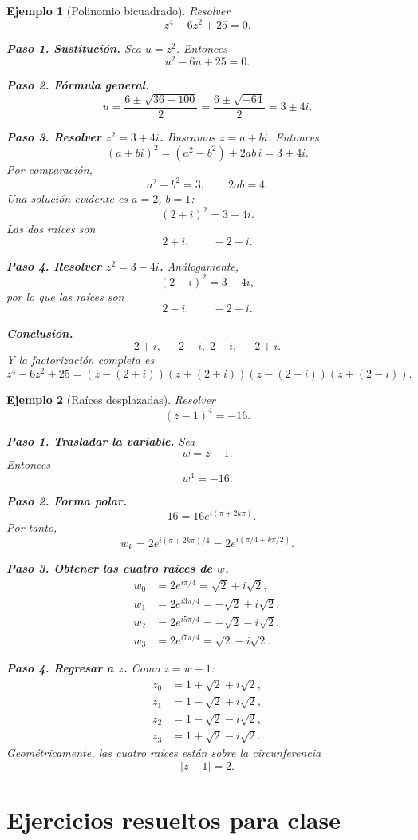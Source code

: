 \documentclass[12pt]{article}
\newtheorem{ejemplo}{Ejemplo}[section]
\begin{document}
\begin{ejemplo}[Polinomio bicuadrado]
Resolver
\[
z^4-6z^2+25=0.
\]

\textbf{Paso 1. Sustitución.}
Sea $u=z^2$. Entonces
\[
u^2-6u+25=0.
\]

\textbf{Paso 2. Fórmula general.}
\[
u=\frac{6\pm\sqrt{36-100}}{2}
=\frac{6\pm\sqrt{-64}}{2}
=3\pm4i.
\]

\textbf{Paso 3. Resolver $z^2=3+4i$.}
Buscamos $z=a+bi$. Entonces
\[
(a+bi)^2=(a^2-b^2)+2ab\,i=3+4i.
\]
Por comparación,
\[
a^2-b^2=3,\qquad 2ab=4.
\]
Una solución evidente es $a=2$, $b=1$:
\[
(2+i)^2=3+4i.
\]
Las dos raíces son
\[
2+i,\qquad -2-i.
\]

\textbf{Paso 4. Resolver $z^2=3-4i$.}
Análogamente,
\[
(2-i)^2=3-4i,
\]
por lo que las raíces son
\[
2-i,\qquad -2+i.
\]

\textbf{Conclusión.}
\[
\boxed{2+i,\;-2-i,\;2-i,\;-2+i.}
\]
Y la factorización completa es
\[
\boxed{
z^4-6z^2+25=
(z-(2+i))(z+(2+i))(z-(2-i))(z+(2-i)).
}
\]
\end{ejemplo}

\begin{ejemplo}[Raíces desplazadas]
Resolver
\[
(z-1)^4=-16.
\]

\textbf{Paso 1. Trasladar la variable.}
Sea
\[
w=z-1.
\]
Entonces
\[
w^4=-16.
\]

\textbf{Paso 2. Forma polar.}
\[
-16=16e^{i(\pi+2k\pi)}.
\]
Por tanto,
\[
w_k=2e^{i(\pi+2k\pi)/4}
=2e^{i(\pi/4+k\pi/2)}.
\]

\textbf{Paso 3. Obtener las cuatro raíces de $w$.}
\[
\begin{aligned}
w_0&=2e^{i\pi/4}=\sqrt2+i\sqrt2,\\
w_1&=2e^{i3\pi/4}=-\sqrt2+i\sqrt2,\\
w_2&=2e^{i5\pi/4}=-\sqrt2-i\sqrt2,\\
w_3&=2e^{i7\pi/4}=\sqrt2-i\sqrt2.
\end{aligned}
\]

\textbf{Paso 4. Regresar a $z$.}
Como $z=w+1$:
\[
\boxed{
\begin{aligned}
z_0&=1+\sqrt2+i\sqrt2,\\
z_1&=1-\sqrt2+i\sqrt2,\\
z_2&=1-\sqrt2-i\sqrt2,\\
z_3&=1+\sqrt2-i\sqrt2.
\end{aligned}}
\]
Geométricamente, las cuatro raíces están sobre la circunferencia
\[
|z-1|=2.
\]
\end{ejemplo}
\section*{Ejercicios resueltos para clase}
\end{document}
